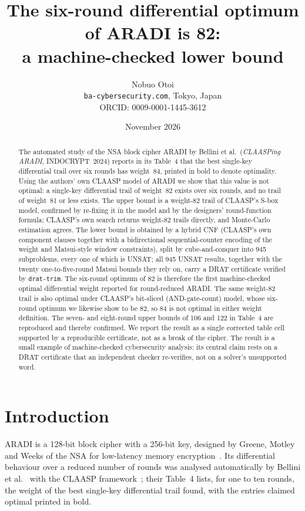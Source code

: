 \documentclass[11pt]{article}
\title{The six-round differential optimum of ARADI is 82:\\
a machine-checked lower bound}
\author{Nobuo Otoi\\
\small \texttt{ba-cybersecurity.com}, Tokyo, Japan\\
\small ORCID: 0009-0001-1445-3612}
\date{November 2026}
\begin{document}
\maketitle

\begin{abstract}
The automated study of the NSA block cipher ARADI by Bellini et al.\ (\emph{CLAASPing ARADI}, INDOCRYPT~2024) reports in its Table~4 that the best single-key differential trail over six rounds has weight~84, printed in bold to denote optimality. Using the authors' own CLAASP model of ARADI we show that this value is not optimal: a single-key differential trail of weight~82 exists over six rounds, and no trail of weight~81 or less exists. The upper bound is a weight-82 trail of CLAASP's S-box model, confirmed by re-fixing it in the model and by the designers' round-function formula; CLAASP's own search returns weight-82 trails directly, and Monte-Carlo estimation agrees. The lower bound is obtained by a hybrid CNF (CLAASP's own component clauses together with a bidirectional sequential-counter encoding of the weight and Matsui-style window constraints), split by cube-and-conquer into 945 subproblems, every one of which is UNSAT; all 945 UNSAT results, together with the twenty one-to-five-round Matsui bounds they rely on, carry a DRAT certificate verified by \texttt{drat-trim}. The six-round optimum of 82 is therefore the first machine-checked optimal differential weight reported for round-reduced ARADI. The same weight-82 trail is also optimal under CLAASP's bit-sliced (AND-gate-count) model, whose six-round optimum we likewise show to be 82, so 84 is not optimal in either weight definition. The seven- and eight-round upper bounds of 106 and 122 in Table~4 are reproduced and thereby confirmed. We report the result as a single corrected table cell supported by a reproducible certificate, not as a break of the cipher. The result is a small example of machine-checked cybersecurity analysis: its central claim rests on a DRAT certificate that an independent checker re-verifies, not on a solver's unsupported word.
\end{abstract}

\section{Introduction}

ARADI is a 128-bit block cipher with a 256-bit key, designed by Greene, Motley and Weeks of the NSA for low-latency memory encryption~\cite{aradi}. Its differential behaviour over a reduced number of rounds was analysed automatically by Bellini et al.~\cite{claasping} with the CLAASP framework~\cite{claasp}; their Table~4 lists, for one to ten rounds, the weight of the best single-key differential trail found, with the entries claimed optimal printed in bold.
\end{document}

